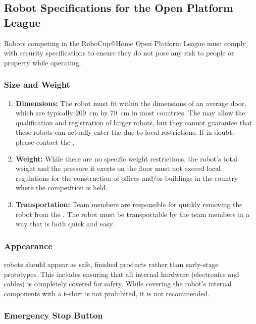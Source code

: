 \subsection{Robot Specifications for the Open Platform League}
Robots competing in the RoboCup@Home Open Platform League must comply with security specifications to ensure they do not pose any risk to people or property while operating.

\subsubsection{Size and Weight}\label{rule:robots_size}

\begin{enumerate}
	\item \textbf{Dimensions:} The robot must fit within the dimensions of an average door, which are typically \SI{200}{\centi\meter} by \SI{70}{\centi\meter} in most countries.
	The \TC{} may allow the qualification and registration of larger robots, but they cannot guarantee that these robots can actually enter the \Arena{} due to local restrictions.
	If in doubt, please contact the \LOC{}.
	\item \textbf{Weight:} While there are no specific weight restrictions, the robot's total weight and the pressure it exerts on the floor must not exceed local regulations for the construction of offices and/or buildings in the country where the competition is held.
	\item \textbf{Transportation:} Team members are responsible for quickly removing the robot from the \Arena{}.
	The robot must be transportable by the team members in a way that is both quick and easy.
\end{enumerate}

\subsubsection{Appearance}\label{rule:robots_appearance}

\OPL{} robots should appear as safe, finished products rather than early-stage prototypes.
This includes ensuring that all internal hardware (electronics and cables) is completely covered for safety.
While covering the robot's internal components with a t-shirt is not prohibited, it is not recommended.

\subsubsection{Emergency Stop Button}\label{rule:robots_emergency_button}

